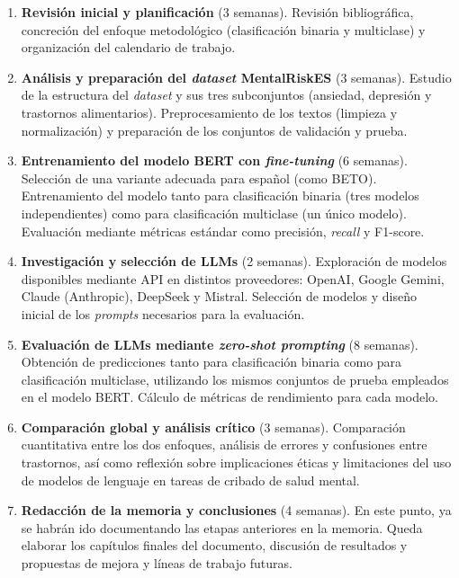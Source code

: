 \documentclass[11pt,a4paper,oneside]{article}
\begin{document}
\begin{enumerate}
	\item \textbf{Revisión inicial y planificación} (3 semanas).  
	Revisión bibliográfica, concreción del enfoque metodológico (clasificación binaria y multiclase) y organización del calendario de trabajo.
	
	\item \textbf{Análisis y preparación del \textit{dataset} MentalRiskES} (3 semanas).  
	Estudio de la estructura del \textit{dataset} y sus tres subconjuntos (ansiedad, depresión y trastornos alimentarios). Preprocesamiento de los textos (limpieza y normalización) y preparación de los conjuntos de validación y prueba.
	
	\item \textbf{Entrenamiento del modelo BERT con \textit{fine-tuning}} (6 semanas).  
	Selección de una variante adecuada para español (como BETO). Entrenamiento del modelo tanto para clasificación binaria (tres modelos independientes) como para clasificación multiclase (un único modelo). Evaluación mediante métricas estándar como precisión, \textit{recall} y F1-score.
	
	\item \textbf{Investigación y selección de LLMs} (2 semanas).  
	Exploración de modelos disponibles mediante API en distintos proveedores: OpenAI, Google Gemini, Claude (Anthropic), DeepSeek y Mistral. Selección de modelos y diseño inicial de los \textit{prompts} necesarios para la evaluación.
	
	\item \textbf{Evaluación de LLMs mediante \textit{zero-shot prompting}} (8 semanas).  
	Obtención de predicciones tanto para clasificación binaria como para clasificación multiclase, utilizando los mismos conjuntos de prueba empleados en el modelo BERT. Cálculo de métricas de rendimiento para cada modelo.
	
	\item \textbf{Comparación global y análisis crítico} (3 semanas).  
	Comparación cuantitativa entre los dos enfoques, análisis de errores y confusiones entre trastornos, así como reflexión sobre implicaciones éticas y limitaciones del uso de modelos de lenguaje en tareas de cribado de salud mental.
	
	\item \textbf{Redacción de la memoria y conclusiones} (4 semanas).  
	En este punto, ya se habrán ido documentando las etapas anteriores en la memoria. Queda elaborar los capítulos finales del documento, discusión de resultados y propuestas de mejora y líneas de trabajo futuras.
\end{enumerate}
\end{document}
